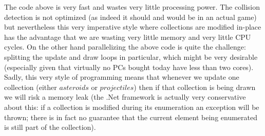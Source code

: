 The code above is very fast and wastes very little processing power. The collision detection is not optimized (as indeed it should and would be in an actual game) but nevertheless this very imperative style where collections are modified in-place has the advantage that we are wasting very little memory and very little CPU cycles. On the other hand parallelizing the above code is quite the challenge: splitting the update and draw loops in particular, which might be very desirable (especially given that virtually no PCs bought today have less than two cores). Sadly, this very style of programming means that whenever we update one collection (either $asteroids$ or $projectiles$) then if that collection is being drawn we will risk a memory leak (the .Net framework is actually very conservative about this: if a collection is modified during its enumeration an exception will be thrown; there is in fact no guarantee that the current element being enumerated is still part of the collection).
